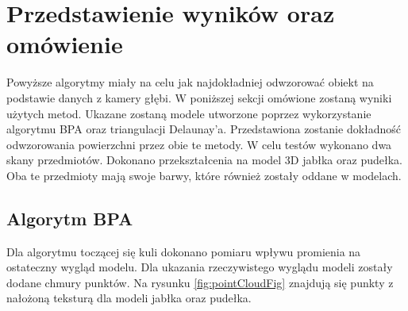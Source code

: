 \section{Przedstawienie wyników oraz omówienie}
Powyższe algorytmy miały na celu jak najdokładniej odwzorować obiekt na podstawie danych z kamery głębi. W poniższej sekcji omówione zostaną wyniki użytych metod. Ukazane zostaną modele utworzone poprzez wykorzystanie algorytmu BPA oraz triangulacji Delaunay'a. Przedstawiona zostanie dokładność odwzorowania powierzchni przez obie te metody. W celu testów wykonano dwa skany przedmiotów. Dokonano przekształcenia na model 3D jabłka oraz pudełka. Oba te przedmioty mają swoje barwy, które również zostały oddane w modelach.
\subsection{Algorytm BPA}
Dla algorytmu toczącej się kuli dokonano pomiaru wpływu promienia na ostateczny wygląd modelu. Dla ukazania rzeczywistego wyglądu modeli zostały dodane chmury punktów. Na rysunku \ref{fig:pointCloudFig} znajdują się punkty z nałożoną teksturą dla modeli jabłka oraz pudełka.
